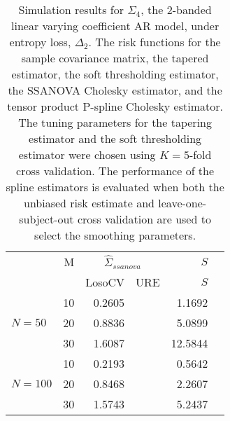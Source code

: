 \documentclass[12pt]{article}
\theoremstyle{definition}
\begin{document}
\begin{table}[ht]
\centering
\caption{Simulation results for $\Sigma_4$, the 2-banded linear varying coefficient AR model, under entropy loss, $\Delta_2$. The risk functions for the sample covariance matrix, the tapered estimator, the soft thresholding estimator, the SSANOVA Cholesky estimator, and the tensor product P-spline Cholesky estimator. The tuning parameters for the tapering estimator and the soft thresholding estimator were chosen using $K = 5$-fold cross validation. The performance of the spline estimators is evaluated when both the unbiased risk estimate and leave-one-subject-out cross validation are used to select the smoothing parameters.}

\begin{tabular}{lrrrrr}
& M & \multicolumn{2}{c}{$\hat{\Sigma}_{ssanova}$} & $S$ \\ 
& & \mbox{LosoCV} & \mbox{URE} & $S$ \\ 
  \hline
&    10 & 0.2605 & &  1.1692 \\ 
$N = 50$ &    20 & 0.8836 &  & 5.0899 \\ 
   &    30 & 1.6087 & &12.5844 \\ \hdashline
 &    10 & 0.2193 && 0.5642 \\ 
  $N = 100$ &    20 & 0.8468 && 2.2607 \\ 
   &    30 & 1.5743 && 5.2437 \\
  \end{tabular}
\end{table}

\end{document}
